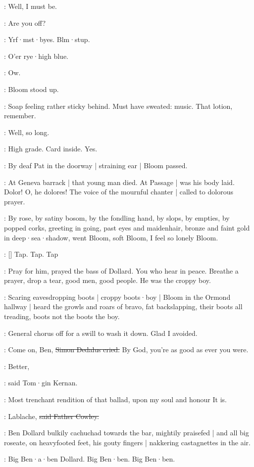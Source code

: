 \Bloom:
Well,
I must be.

\goulding:
Are you off?

:
Yrf·mst·byes.
Blm·stup.

:
O'er rye·high blue.

\BloomIntA:
Ow.

:
Bloom stood up.

\BloomIntA:
Soap feeling rather sticky behind.
Must have sweated:
music.
That lotion,
remember.

\Bloom:
Well,
so long.

\BloomIntA:
High grade.
Card inside.
Yes.

:
By deaf Pat in the doorway |
straining ear |
Bloom passed.

:
At Geneva barrack |
that young man died.
At Passage |
was his body laid.
Dolor!
O,
he dolores!
The voice of the mournful chanter |
called to dolorous prayer.

:
By rose,
by satiny bosom,
by the fondling hand,
by slops,
by empties,
by popped corks,
greeting in going,
past eyes and maidenhair,
bronze and faint gold in deep·sea·shadow,
went Bloom,
soft Bloom,
I feel so lonely Bloom.

\stripling:
[]
Tap.
Tap.
Tap

:
Pray for him,
prayed the bass of Dollard.
You who hear in peace.
Breathe a prayer,
drop a tear,
good men,
good people.
He was the croppy boy.

:
Scaring eavesdropping boots |
croppy boots·boy |
Bloom in the Ormond hallway |
heard the growls and roars of bravo,
fat backslapping,
their boots all treading,
boots not the boots the boy.

\BloomIntA:
General chorus off for a swill to wash it down.
Glad I avoided.

\simon:
Come on,
Ben,
\sout{Simon Dedalus cried.}
By God,
you're as good as ever you were.

:
Better,

:
said Tom·gin Kernan.

:
Most trenchant rendition of that ballad,
upon my soul and honour It is.

\cowley:
Lablache,
\sout{said Father Cowley.}

:
Ben Dollard bulkily cachuchad towards the bar,
mightily praisefed |
and all big roseate,
on heavyfooted feet,
his gouty fingers |
nakkering castagnettes in the air.

:
Big Ben·a·ben Dollard.
Big Ben·ben.
Big Ben·ben.

